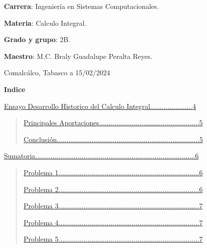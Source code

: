 \documentclass[12pt]{article}
\begin{document}
\fontsize{16}{35}\selectfont
\textbf{Carrera}: Ingeniería en Sistemas Computacionales.

\fontsize{16}{35}\selectfont
\textbf{Materia}: Calculo Integral.

\fontsize{16}{35}\selectfont
\textbf{Grado y grupo}: 2B.

\fontsize{16}{35}\selectfont
\textbf{Maestro}: M.C. Braly Guadalupe Peralta Reyes.

\raggedleft

\fontsize{15}{100}\selectfont
Comalcálco, Tabasco a 15/02/2024

\newpage
\raggedright

\fontsize{17}{100}\selectfont
\textbf{Indice}

\raggedright

\fontsize{16}{105}\selectfont
\hyperref[rehearsal-title-y]{Ensayo Desarrollo Historico del Calculo Integral......................4}

\begin{quote}
  \raggedleft

  \fontsize{16}{30}\selectfont
  \hyperref[rehearsal-primary]{Principales Aportaciones....................................................5}

  \fontsize{16}{30}\selectfont
  \hyperref[rehearsal-end]{Conclusión..........................................................................5}
\end{quote}

\fontsize{16}{105}\selectfont
\hyperref[sec:sumatoria]{Sumatoria...................................................................................6}
\begin{quote}
  \raggedleft

  \fontsize{16}{30}\selectfont
  \hyperref[sumatoria:problema_1]{Problema 1.........................................................................6}

  \fontsize{16}{30}\selectfont
  \hyperref[sumatoria:problema_2]{Problema 2.........................................................................6}

  \fontsize{16}{30}\selectfont
  \hyperref[sumatoria:problema_3]{Problema 3.........................................................................7}

  \fontsize{16}{30}\selectfont
  \hyperref[sumatoria:problema_4]{Problema 4.........................................................................7}

  \fontsize{16}{30}\selectfont
  \hyperref[sumatoria:problema_5]{Problema 5.........................................................................7}
\end{quote}
\end{document}
